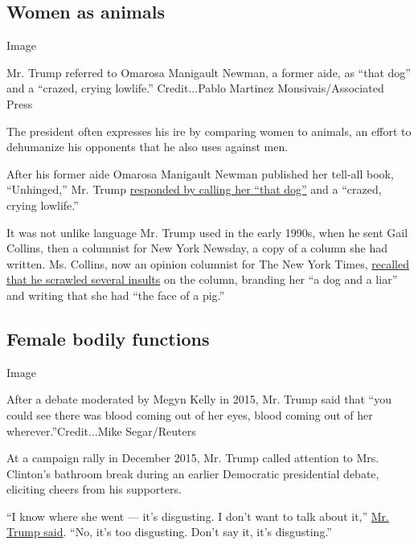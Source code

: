 \hypertarget{women-as-animals}{%
\subsection{Women as animals}\label{women-as-animals}}

Image

Mr. Trump referred to Omarosa Manigault Newman, a former aide, as ``that
dog'' and a ``crazed, crying lowlife.'' Credit...Pablo Martinez
Monsivais/Associated Press

The president often expresses his ire by comparing women to animals, an
effort to dehumanize his opponents that he also uses against men.

After his former aide Omarosa Manigault Newman published her tell-all
book, ``Unhinged,'' Mr. Trump
\href{https://www.nytimes3xbfgragh.onion/2018/08/14/us/politics/trump-omarosa-dog.html}{responded
by calling her ``that dog''} and a ``crazed, crying lowlife.''

It was not unlike language Mr. Trump used in the early 1990s, when he
sent Gail Collins, then a columnist for New York Newsday, a copy of a
column she had written. Ms. Collins, now an opinion columnist for The
New York Times,
\href{https://www.nytimes3xbfgragh.onion/2018/08/15/opinion/trump-omarosa-dogs-insults.html}{recalled
that he scrawled several insults} on the column, branding her ``a dog
and a liar'' and writing that she had ``the face of a pig.''

\hypertarget{female-bodily-functions}{%
\subsection{Female bodily functions}\label{female-bodily-functions}}

Image

After a debate moderated by Megyn Kelly in 2015, Mr. Trump said that
``you could see there was blood coming out of her eyes, blood coming out
of her wherever.''Credit...Mike Segar/Reuters

At a campaign rally in December 2015, Mr. Trump called attention to Mrs.
Clinton's bathroom break during an earlier Democratic presidential
debate, eliciting cheers from his supporters.

``I know where she went --- it's disgusting. I don't want to talk about
it,''
\href{https://www.nytimes3xbfgragh.onion/2015/12/24/us/politics/hillary-clinton-donald-trump-women-isis.html}{Mr.
Trump said}. ``No, it's too disgusting. Don't say it, it's disgusting.''

